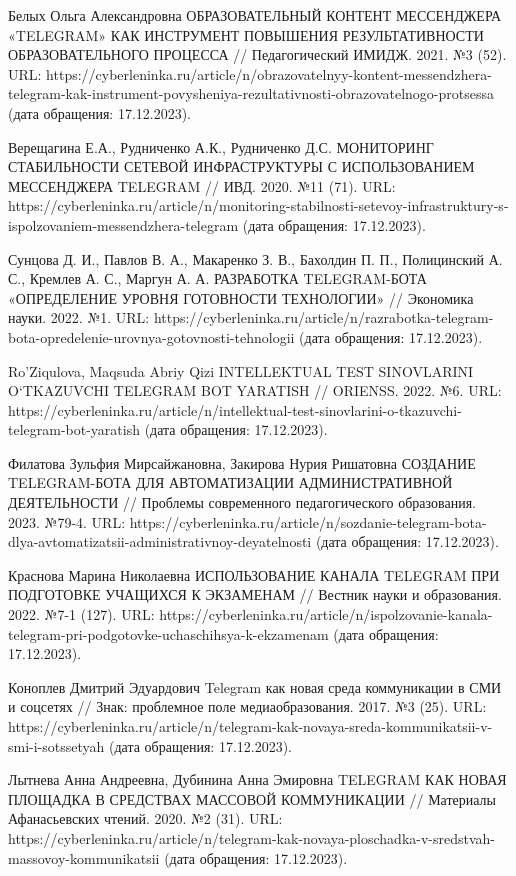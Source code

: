 \documentclass{article}
\begin{document}
Белых Ольга Александровна ОБРАЗОВАТЕЛЬНЫЙ КОНТЕНТ МЕССЕНДЖЕРА «TELEGRAM» КАК ИНСТРУМЕНТ ПОВЫШЕНИЯ РЕЗУЛЬТАТИВНОСТИ ОБРАЗОВАТЕЛЬНОГО ПРОЦЕССА // Педагогический ИМИДЖ. 2021. №3 (52). URL: https://cyberleninka.ru/article/n/obrazovatelnyy-kontent-messendzhera-telegram-kak-instrument-povysheniya-rezultativnosti-obrazovatelnogo-protsessa (дата обращения: 17.12.2023).

Верещагина Е.А., Рудниченко А.К., Рудниченко Д.С. МОНИТОРИНГ СТАБИЛЬНОСТИ СЕТЕВОЙ ИНФРАСТРУКТУРЫ С ИСПОЛЬЗОВАНИЕМ МЕССЕНДЖЕРА TELEGRAM // ИВД. 2020. №11 (71). URL: https://cyberleninka.ru/article/n/monitoring-stabilnosti-setevoy-infrastruktury-s-ispolzovaniem-messendzhera-telegram (дата обращения: 17.12.2023).

Сунцова Д. И., Павлов В. А., Макаренко З. В., Бахолдин П. П., Полицинский А. С., Кремлев А. С., Маргун А. А. РАЗРАБОТКА TELEGRAM-БОТА «ОПРЕДЕЛЕНИЕ УРОВНЯ ГОТОВНОСТИ ТЕХНОЛОГИИ» // Экономика науки. 2022. №1. URL: https://cyberleninka.ru/article/n/razrabotka-telegram-bota-opredelenie-urovnya-gotovnosti-tehnologii (дата обращения: 17.12.2023).

Ro’Ziqulova, Maqsuda Abriy Qizi INTELLEKTUAL TEST SINOVLARINI O‘TKAZUVCHI TELEGRAM BOT YARATISH // ORIENSS. 2022. №6. URL: https://cyberleninka.ru/article/n/intellektual-test-sinovlarini-o-tkazuvchi-telegram-bot-yaratish (дата обращения: 17.12.2023).

Филатова Зульфия Мирсайжановна, Закирова Нурия Ришатовна СОЗДАНИЕ TELEGRAM-БОТА ДЛЯ АВТОМАТИЗАЦИИ АДМИНИСТРАТИВНОЙ ДЕЯТЕЛЬНОСТИ // Проблемы современного педагогического образования. 2023. №79-4. URL: https://cyberleninka.ru/article/n/sozdanie-telegram-bota-dlya-avtomatizatsii-administrativnoy-deyatelnosti (дата обращения: 17.12.2023).

Краснова Марина Николаевна ИСПОЛЬЗОВАНИЕ КАНАЛА TELEGRAM ПРИ ПОДГОТОВКЕ УЧАЩИХСЯ К ЭКЗАМЕНАМ // Вестник науки и образования. 2022. №7-1 (127). URL: https://cyberleninka.ru/article/n/ispolzovanie-kanala-telegram-pri-podgotovke-uchaschihsya-k-ekzamenam (дата обращения: 17.12.2023).

Коноплев Дмитрий Эдуардович Telegram как новая среда коммуникации в СМИ и соцсетях // Знак: проблемное поле медиаобразования. 2017. №3 (25). URL: https://cyberleninka.ru/article/n/telegram-kak-novaya-sreda-kommunikatsii-v-smi-i-sotssetyah (дата обращения: 17.12.2023).

Лытнева Анна Андреевна, Дубинина Анна Эмировна TELEGRAM КАК НОВАЯ ПЛОЩАДКА В СРЕДСТВАХ МАССОВОЙ КОММУНИКАЦИИ // Материалы Афанасьевских чтений. 2020. №2 (31). URL: https://cyberleninka.ru/article/n/telegram-kak-novaya-ploschadka-v-sredstvah-massovoy-kommunikatsii (дата обращения: 17.12.2023).
\end{document}
